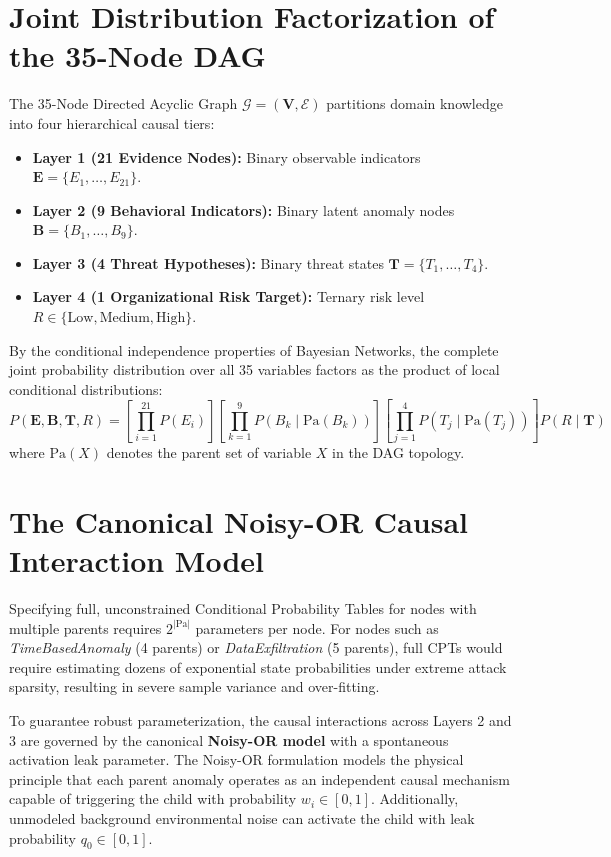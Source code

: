 \documentclass[12pt,a4paper]{report}
\begin{document}
\section{Joint Distribution Factorization of the 35-Node DAG}
The 35-Node Directed Acyclic Graph $\mathcal{G} = (\mathbf{V}, \mathcal{E})$ partitions domain knowledge into four hierarchical causal tiers:
\begin{itemize}
    \item \textbf{Layer 1 (21 Evidence Nodes):} Binary observable indicators $\mathbf{E} = \{E_1, \dots, E_{21}\}$.
    \item \textbf{Layer 2 (9 Behavioral Indicators):} Binary latent anomaly nodes $\mathbf{B} = \{B_1, \dots, B_9\}$.
    \item \textbf{Layer 3 (4 Threat Hypotheses):} Binary threat states $\mathbf{T} = \{T_1, \dots, T_4\}$.
    \item \textbf{Layer 4 (1 Organizational Risk Target):} Ternary risk level $R \in \{\text{Low}, \text{Medium}, \text{High}\}$.
\end{itemize}
By the conditional independence properties of Bayesian Networks, the complete joint probability distribution over all 35 variables factors as the product of local conditional distributions:
\begin{equation}
P(\mathbf{E}, \mathbf{B}, \mathbf{T}, R) = \left[\prod_{i=1}^{21} P(E_i)\right] \left[\prod_{k=1}^9 P(B_k \mid \text{Pa}(B_k))\right] \left[\prod_{j=1}^4 P(T_j \mid \text{Pa}(T_j))\right] P(R \mid \mathbf{T})
\label{eq:joint_factorization}
\end{equation}
where $\text{Pa}(X)$ denotes the parent set of variable $X$ in the DAG topology.

\section{The Canonical Noisy-OR Causal Interaction Model}
Specifying full, unconstrained Conditional Probability Tables for nodes with multiple parents requires $2^{|\text{Pa}|}$ parameters per node. For nodes such as \textit{TimeBasedAnomaly} (4 parents) or \textit{DataExfiltration} (5 parents), full CPTs would require estimating dozens of exponential state probabilities under extreme attack sparsity, resulting in severe sample variance and over-fitting.

To guarantee robust parameterization, the causal interactions across Layers 2 and 3 are governed by the canonical \textbf{Noisy-OR model} with a spontaneous activation leak parameter. The Noisy-OR formulation models the physical principle that each parent anomaly operates as an independent causal mechanism capable of triggering the child with probability $w_i \in [0, 1]$. Additionally, unmodeled background environmental noise can activate the child with leak probability $q_0 \in [0, 1]$.
\end{document}
